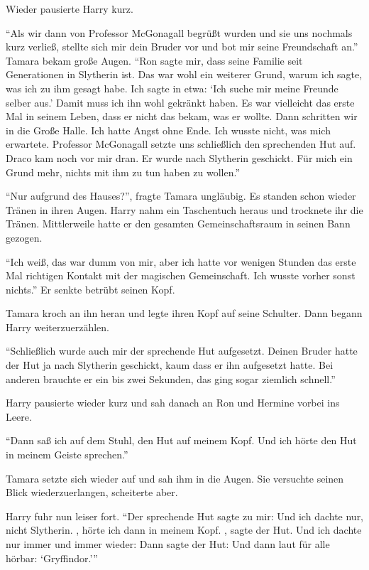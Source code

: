 Wieder pausierte Harry kurz.

\enquote{Als wir dann von Professor McGonagall begrüßt wurden und sie uns nochmals kurz verließ, stellte sich mir dein Bruder vor und bot mir seine Freundschaft an.} Tamara bekam große Augen. \enquote{Ron sagte mir, dass seine Familie seit Generationen in Slytherin ist. Das war wohl ein weiterer Grund, warum ich sagte, was ich zu ihm gesagt habe. Ich sagte in etwa: \enquote{Ich suche mir meine Freunde selber aus.} \gst Damit muss ich ihn wohl gekränkt haben. Es war vielleicht das erste Mal in seinem Leben, dass er nicht das bekam, was er wollte. Dann schritten wir in die Große Halle. Ich hatte Angst ohne Ende. Ich wusste nicht, was mich erwartete. Professor McGonagall setzte uns schließlich den sprechenden Hut auf. Draco kam noch vor mir dran. Er wurde nach Slytherin geschickt. Für mich ein Grund mehr, nichts mit ihm zu tun haben zu wollen.}

\enquote{Nur aufgrund des Hauses?}, fragte Tamara ungläubig. Es standen schon wieder Tränen in ihren Augen. Harry nahm ein Taschentuch heraus und trocknete ihr die Tränen. Mittlerweile hatte er den gesamten Gemeinschaftsraum in seinen Bann gezogen.

\enquote{Ich weiß, das war dumm von mir, aber ich hatte vor wenigen Stunden das erste Mal richtigen Kontakt mit der magischen Gemeinschaft. Ich wusste vorher sonst nichts.} Er senkte betrübt seinen Kopf.

Tamara kroch an ihn heran und legte ihren Kopf auf seine Schulter. Dann begann Harry weiterzuerzählen.

\enquote{Schließlich wurde auch mir der sprechende Hut aufgesetzt. Deinen Bruder hatte der Hut ja nach Slytherin geschickt, kaum dass er ihn aufgesetzt hatte. Bei anderen brauchte er ein bis zwei Sekunden, das ging sogar ziemlich schnell.}

Harry pausierte wieder kurz und sah danach an Ron und Hermine vorbei ins Leere.

\enquote{Dann saß ich auf dem Stuhl, den Hut auf meinem Kopf. Und ich hörte den Hut in meinem Geiste sprechen.}

Tamara setzte sich wieder auf und sah ihm in die Augen. Sie versuchte seinen Blick wiederzuerlangen, scheiterte aber.

Harry fuhr nun leiser fort. \enquote{Der sprechende Hut sagte zu mir:  Und ich dachte nur, nicht Slytherin. , hörte ich dann in meinem Kopf. , sagte der Hut. Und ich dachte nur immer und immer wieder:  Dann sagte der Hut:  Und dann laut für alle hörbar: \enquote{Gryffindor.}}


